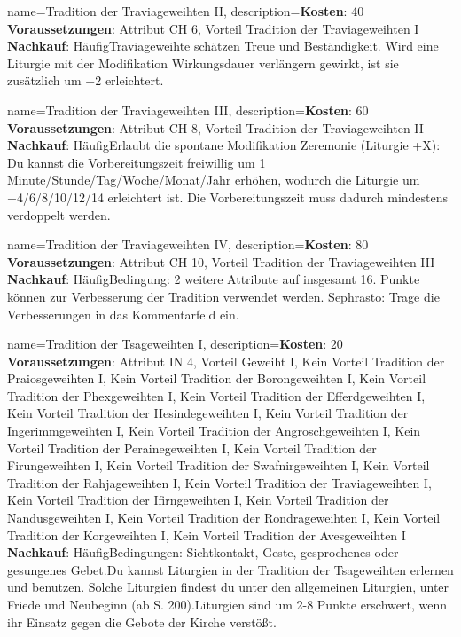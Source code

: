 {
    name={Tradition der Traviageweihten II},
    description={\textbf{Kosten}: 40 \textbf{Voraussetzungen}: Attribut CH 6, Vorteil Tradition der Traviageweihten I \textbf{Nachkauf}: Häufig\newline Traviageweihte schätzen Treue und Beständigkeit. Wird eine Liturgie mit der Modifikation Wirkungsdauer verlängern gewirkt, ist sie zusätzlich um +2 erleichtert.}
}


{
    name={Tradition der Traviageweihten III},
    description={\textbf{Kosten}: 60 \textbf{Voraussetzungen}: Attribut CH 8, Vorteil Tradition der Traviageweihten II \textbf{Nachkauf}: Häufig\newline Erlaubt die spontane Modifikation Zeremonie (Liturgie +X): Du kannst die Vorbereitungszeit freiwillig um 1 Minute/Stunde/Tag/Woche/Monat/Jahr erhöhen, wodurch die Liturgie um +4/6/8/10/12/14 erleichtert ist. Die Vorbereitungszeit muss dadurch mindestens verdoppelt werden.}
}


{
    name={Tradition der Traviageweihten IV},
    description={\textbf{Kosten}: 80 \textbf{Voraussetzungen}: Attribut CH 10, Vorteil Tradition der Traviageweihten III \textbf{Nachkauf}: Häufig\newline Bedingung: 2 weitere Attribute auf insgesamt 16. Punkte können zur Verbesserung der Tradition verwendet werden. Sephrasto: Trage die Verbesserungen in das Kommentarfeld ein.}
}


{
    name={Tradition der Tsageweihten I},
    description={\textbf{Kosten}: 20 \textbf{Voraussetzungen}: Attribut IN 4, Vorteil Geweiht I, Kein Vorteil Tradition der Praiosgeweihten I, Kein Vorteil Tradition der Borongeweihten I, Kein Vorteil Tradition der Phexgeweihten I, Kein Vorteil Tradition der Efferdgeweihten I, Kein Vorteil Tradition der Hesindegeweihten I, Kein Vorteil Tradition der Ingerimmgeweihten I, Kein Vorteil Tradition der Angroschgeweihten I, Kein Vorteil Tradition der Perainegeweihten I, Kein Vorteil Tradition der Firungeweihten I, Kein Vorteil Tradition der Swafnirgeweihten I, Kein Vorteil Tradition der Rahjageweihten I, Kein Vorteil Tradition der Traviageweihten I, Kein Vorteil Tradition der Ifirngeweihten I, Kein Vorteil Tradition der Nandusgeweihten I, Kein Vorteil Tradition der Rondrageweihten I, Kein Vorteil Tradition der Korgeweihten I, Kein Vorteil Tradition der Avesgeweihten I \textbf{Nachkauf}: Häufig\newline Bedingungen: Sichtkontakt, Geste, gesprochenes oder gesungenes Gebet.\newline Du kannst Liturgien in der Tradition der Tsageweihten erlernen und benutzen. Solche Liturgien findest du unter den allgemeinen Liturgien, unter Friede und Neubeginn (ab S. 200).\newline Liturgien sind um 2-8 Punkte erschwert, wenn ihr Einsatz gegen die Gebote der Kirche verstößt.}
}


